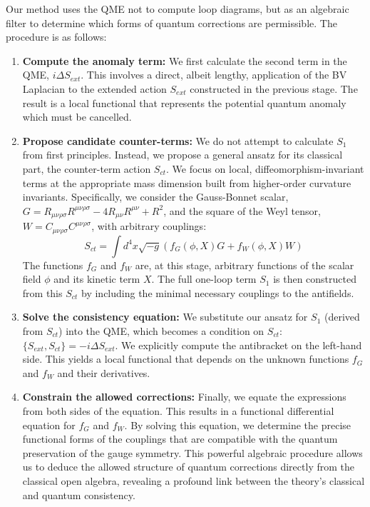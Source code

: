 \documentclass[twocolumn]{aastex631}
\begin{document}
Our method uses the QME not to compute loop diagrams, but as an algebraic filter to determine which forms of quantum corrections are permissible. The procedure is as follows:
\begin{enumerate}
    \item \textbf{Compute the anomaly term:} We first calculate the second term in the QME, $i \Delta S_{ext}$. This involves a direct, albeit lengthy, application of the BV Laplacian to the extended action $S_{ext}$ constructed in the previous stage. The result is a local functional that represents the potential quantum anomaly which must be cancelled.
    
    \item \textbf{Propose candidate counter-terms:} We do not attempt to calculate $S_1$ from first principles. Instead, we propose a general ansatz for its classical part, the counter-term action $S_{ct}$. We focus on local, diffeomorphism-invariant terms at the appropriate mass dimension built from higher-order curvature invariants. Specifically, we consider the Gauss-Bonnet scalar, $G = R_{\mu\nu\rho\sigma}R^{\mu\nu\rho\sigma} - 4 R_{\mu\nu}R^{\mu\nu} + R^2$, and the square of the Weyl tensor, $W = C_{\mu\nu\rho\sigma}C^{\mu\nu\rho\sigma}$, with arbitrary couplings:
    \begin{equation}
        S_{ct} = \int d^4x \sqrt{-g} \left( f_G(\phi, X) G + f_W(\phi, X) W \right)
    \end{equation}
    The functions $f_G$ and $f_W$ are, at this stage, arbitrary functions of the scalar field $\phi$ and its kinetic term $X$. The full one-loop term $S_1$ is then constructed from this $S_{ct}$ by including the minimal necessary couplings to the antifields.

    \item \textbf{Solve the consistency equation:} We substitute our ansatz for $S_1$ (derived from $S_{ct}$) into the QME, which becomes a condition on $S_{ct}$: $\{S_{ext}, S_{ct}\} = -i \Delta S_{ext}$. We explicitly compute the antibracket on the left-hand side. This yields a local functional that depends on the unknown functions $f_G$ and $f_W$ and their derivatives.
    
    \item \textbf{Constrain the allowed corrections:} Finally, we equate the expressions from both sides of the equation. This results in a functional differential equation for $f_G$ and $f_W$. By solving this equation, we determine the precise functional forms of the couplings that are compatible with the quantum preservation of the gauge symmetry. This powerful algebraic procedure allows us to deduce the allowed structure of quantum corrections directly from the classical open algebra, revealing a profound link between the theory's classical and quantum consistency.
\end{enumerate}
\end{document}

